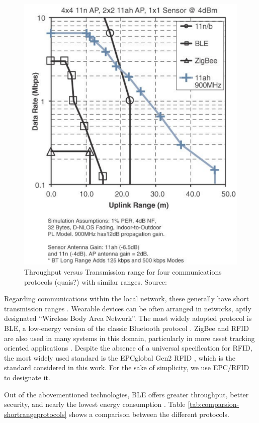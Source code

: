 \begin{figure}[H] 
    \centering
    \includegraphics[width=0.55\linewidth]{images/communication-protocols-throughput.png}
    \caption{Throughput versus Transmission range for four communications protocols (quais?) with similar ranges. Source: \cite{10.5555/3161403}}
    \label{fig:communication-protocols-throughput}
\end{figure}

Regarding communications within the local network, these generally have short transmission ranges \cite{Baker2017}. Wearable devices can be often arranged in networks, aptly designated ``Wireless Body Area Network''. The most widely adopted protocol is \acf{BLE}, a low-energy version of the classic Bluetooth protocol \cite{Doukas2012, Wu2019, Wu2020}. ZigBee and \acf{RFID} are also used in many systems in this domain, particularly in more asset tracking oriented applications \cite{Fuhrer2006, Catarinucci2015, Adame2018}. Despite the absence of a universal specification for \acs{RFID}, the most widely used standard is the EPCglobal Gen2 RFID \cite{EPCglobal2006}, which is the standard considered in this work. For the sake of simplicity, we use \acs{EPC/RFID} to designate it. \bigskip

Out of the abovementioned technologies, \acs{BLE} offers greater throughput, better security, and nearly the lowest energy consumption \cite{dementyev2013power}. Table \ref{tab:comparsion-shortrangeprotocols} shows a comparison between the different protocols.

